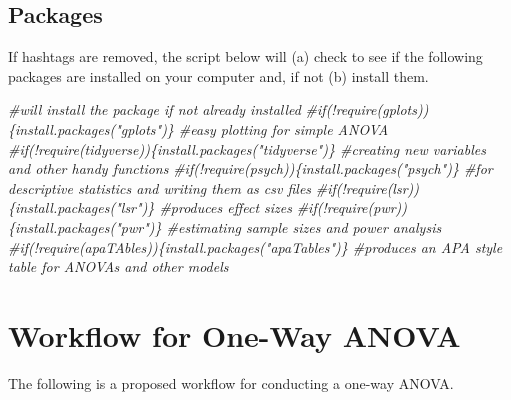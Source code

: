 \documentclass[
  english,
]{book}
\newenvironment{Shaded}{\begin{snugshade}}{\end{snugshade}}
\newcommand{\CommentTok}[1]{\textcolor[rgb]{0.56,0.35,0.01}{\textit{#1}}}
\begin{document}
\hypertarget{packages-1}{%
\subsection{Packages}\label{packages-1}}

If hashtags are removed, the script below will (a) check to see if the following packages are installed on your computer and, if not (b) install them.

\begin{Shaded}
\begin{Highlighting}[]
\CommentTok{\#will install the package if not already installed}
\CommentTok{\#if(!require(gplots))\{install.packages("gplots")\} \#easy plotting for simple ANOVA}
\CommentTok{\#if(!require(tidyverse))\{install.packages("tidyverse")\} \#creating new variables and other handy functions}
\CommentTok{\#if(!require(psych))\{install.packages("psych")\} \#for descriptive statistics and writing them as csv files}
\CommentTok{\#if(!require(lsr))\{install.packages("lsr")\} \#produces effect sizes}
\CommentTok{\#if(!require(pwr))\{install.packages("pwr")\} \#estimating sample sizes and power analysis}
\CommentTok{\#if(!require(apaTAbles))\{install.packages("apaTables")\} \#produces an APA style table for ANOVAs and other models}
\end{Highlighting}
\end{Shaded}

\hypertarget{workflow-for-one-way-anova}{%
\section{Workflow for One-Way ANOVA}\label{workflow-for-one-way-anova}}

The following is a proposed workflow for conducting a one-way ANOVA.
\end{document}
